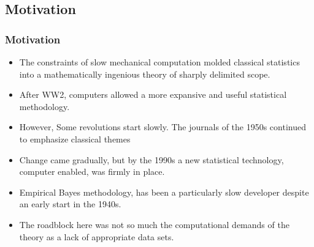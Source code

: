\documentclass[
  shownotes,
  xcolor={svgnames},
  hyperref={colorlinks,citecolor=DarkBlue,linkcolor=DarkRed,urlcolor=DarkBlue}
  , aspectratio=169]{beamer}
\begin{document}
\subsection{Motivation}
\begin{frame}[fragile]
\frametitle{Motivation}


\begin{itemize}
  \small
\item The constraints of slow mechanical computation molded classical statistics into a mathematically ingenious theory of sharply delimited scope. 
\medskip
\item After WW2, computers  allowed a more expansive and useful statistical methodology.
\medskip
\item However, Some revolutions start slowly. The journals of the 1950s continued to emphasize classical themes
\medskip
\item Change came gradually, but by the 1990s a new statistical technology, computer enabled, was firmly in place. 
\medskip
\item Empirical Bayes methodology, has been a particularly slow developer despite an early start in the 1940s. 
\medskip
\item The roadblock here was not so much the computational demands of the theory as a lack of appropriate data sets. 

\end{itemize}
\end{frame}
\end{document}
